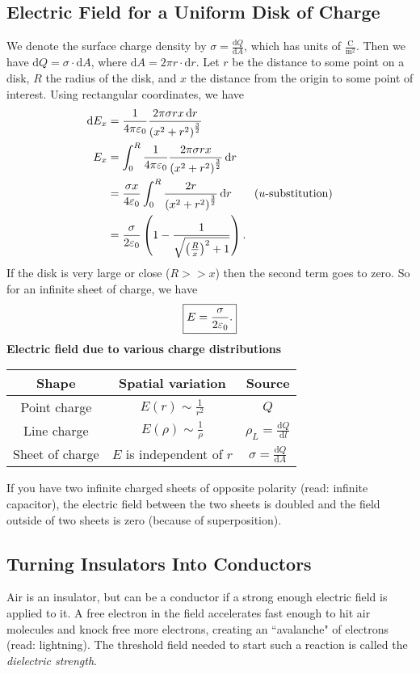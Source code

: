 \documentclass[class=article, crop=false]{standalone}
\begin{document}
  \subsection{Electric Field for a Uniform Disk of Charge}
  We denote the surface charge density by $\sigma = \frac{\mathrm{d}Q}{\mathrm{d}A}$, which has units of $\frac{\mathrm{C}}{\mathrm{m}^2}$. Then we have $\mathrm{d}Q = \sigma\cdot \mathrm{d}A$, where $\mathrm{d}A = 2\pi r\cdot \mathrm{d}r$. Let $r$ be the distance to some point on a disk, $R$ the radius of the disk, and $x$ the distance from the origin to some point of interest. Using rectangular coordinates, we have
  \begin{align*}
    \mathrm{d}E_x &= \frac{1}{4\pi\varepsilon_0}\frac{2\pi\sigma rx \,\mathrm{d}r}{\left( x^2 + r^2 \right)^{\frac{3}{2}}} \\
    E_x &= \int_{0}^{R}\frac{1}{4\pi\varepsilon_0}\frac{2\pi\sigma rx}{\left( x^2 + r^2 \right)^{\frac{3}{2}}}\,\mathrm{d}r \\
        &= \frac{\sigma x}{4\varepsilon_0}\int_{0}^{R}\frac{2r}{\left( x^2 + r^2 \right)^{\frac{3}{2}}} \,\mathrm{d}r \tag{$u$-substitution} \\
        &= \frac{\sigma}{2\varepsilon_0}\left( 1 - \frac{1}{\sqrt{\left( \frac{R}{x} \right)^2+1}} \right).
  \end{align*}
  If the disk is very large or close ($R >> x$) then the second term goes to zero. So for an infinite sheet of charge, we have
  \[
    \boxed{E = \frac{\sigma}{2\varepsilon_0}.}
  \]
  \textbf{Electric field due to various charge distributions}
  \begin{center}
    \begin{tabular}{c|c|c}
      Shape & Spatial variation & Source \\
      \hline
      Point charge & $E(r)\sim \frac{1}{r^2}$ & $Q$ \\[10pt]
      Line charge & $E(\rho)\sim \frac{1}{\rho}$ & $\rho_L = \frac{\mathrm{d}Q}{\mathrm{d}l}$ \\[10pt]
      Sheet of charge & $E$ is independent of $r$ & $\sigma = \frac{\mathrm{d}Q}{\mathrm{d}A}$
    \end{tabular}
  \end{center}
  If you have two infinite charged sheets of opposite polarity (read: infinite capacitor), the electric field between the two sheets is doubled and the field outside of two sheets is zero (because of superposition).
  \subsection{Turning Insulators Into Conductors}
  Air is an insulator, but can be a conductor if a strong enough electric field is applied to it. A free electron in the field accelerates fast enough to hit air molecules and knock free more electrons, creating an ``avalanche" of electrons (read: lightning). The threshold field needed to start such a reaction is called the \emph{dielectric strength}.
  \newpage
\end{document}
